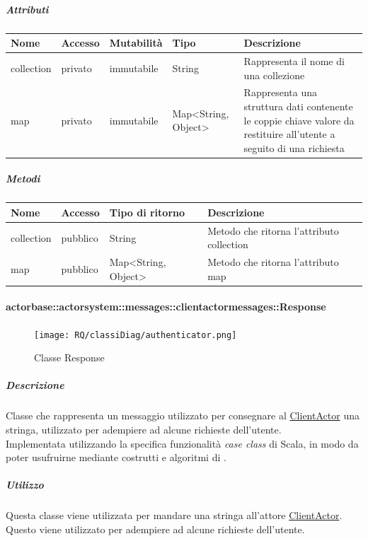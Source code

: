 \documentclass{scalatekids-article}
\begin{document}
\subparagraph{Attributi}
\begin{tabular}{| p{2cm} | p{1.5cm} | p{2cm} | p{3cm} | p{8.5cm} |}
  \hline
  Nome & Accesso & Mutabilità & Tipo & Descrizione\\
  \hline
  collection & privato & immutabile & String & Rappresenta il nome di una collezione\\
  \hline
  map & privato & immutabile & Map<String, Object> & Rappresenta una struttura dati contenente le coppie chiave valore da restituire all'utente a seguito di una richiesta\\
  \hline
\end{tabular}

\subparagraph{Metodi}
\begin{tabular}{| l | l | l | l |}
  \hline
  Nome & Accesso & Tipo di ritorno & Descrizione\\
  \hline
  collection & pubblico & String & Metodo che ritorna l'attributo collection\\
  \hline
  map & pubblico & Map<String, Object> & Metodo che ritorna l'attributo map\\
  \hline
\end{tabular}

\paragraph{actorbase::actorsystem::messages::clientactormessages::Response}
\label{sec:actorbase::actorsystem::messages::clientactormessages::Response}

\begin{figure}[H]
  \begin{center}
    \texttt{[image: RQ/classiDiag/authenticator.png]}
    \caption{Classe Response}
  \end{center}
\end{figure}

\subparagraph{Descrizione}
Classe che rappresenta un messaggio utilizzato per consegnare al
\hyperref[sec:actorbase::actorsystem::actors::clientactor::ClientActor]{ClientActor} una stringa, utilizzato per adempiere ad alcune
richieste dell'utente.\\Implementata utilizzando la specifica funzionalità \textit{case class} di Scala,
in modo da poter usufruirne mediante costrutti e algoritmi di
.

\subparagraph{Utilizzo}
Questa classe viene utilizzata per mandare una stringa all'attore
\hyperref[sec:actorbase::actorsystem::actors::clientactor::ClientActor]{ClientActor}.
Questo viene utilizzato per adempiere ad alcune richieste dell'utente.
\end{document}
